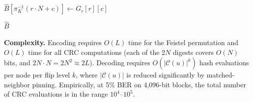 \begin{algorithm}
\begin{algorithmic}[1]
    \State $\hat{B}[\pi_K^{-1}(r \cdot N + c)] \leftarrow G_r[r][c]$
\EndFor

\State \Return $\hat{B}$
\end{algorithmic}
\end{algorithm}

\noindent\textbf{Complexity.} Encoding requires $O(L)$ time for the Feistel permutation and $O(L)$ time for all CRC computations (each of the $2N$ digests covers $O(N)$ bits, and $2N \cdot N = 2N^2 \approx 2L$). Decoding requires $O(|\mathcal{C}(u)|^k)$ hash evaluations per node per flip level $k$, where $|\mathcal{C}(u)|$ is reduced significantly by matched-neighbor pinning. Empirically, at 5\% BER on 4,096-bit blocks, the total number of CRC evaluations is in the range $10^4$--$10^5$.
